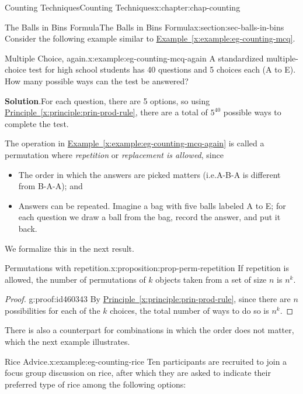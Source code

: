 \documentclass[oneside,10pt,]{book}
\newcommand{\blocktitlefont}{\relax}
\newcommand{\xreffont}{\relax}
\numberwithin{equation}{section}
\begin{document}
\begin{chapterptx}{Counting Techniques}{}{Counting Techniques}{}{}{x:chapter:chap-counting}
\begin{sectionptx}{The Balls in Bins Formula}{}{The Balls in Bins Formula}{}{}{x:section:sec-balls-in-bins}
Consider the following example similar to \hyperref[x:example:eg-counting-mcq]{Example~{\xreffont\ref{x:example:eg-counting-mcq}}}.%
\begin{example}{Multiple Choice, again.}{x:example:eg-counting-mcq-again}%
A standardized multiple-choice test for high school students has 40 questions and 5 choices each (A to E). How many possible ways can the test be answered?%
\par\smallskip%
\noindent\textbf{\blocktitlefont Solution}.\hypertarget{g:solution:id462530}{}\quad{}For each question, there are 5 options, so using \hyperref[x:principle:prin-prod-rule]{Principle~{\xreffont\ref{x:principle:prin-prod-rule}}}, there are a total of \(5^{40}\) possible ways to complete the test.%
\end{example}
The operation in \hyperref[x:example:eg-counting-mcq-again]{Example~{\xreffont\ref{x:example:eg-counting-mcq-again}}} is called a permutation where \emph{repetition} or \emph{replacement is allowed}, since%
\begin{itemize}[label=\textbullet]
\item{}The order in which the answers are picked matters (i.e.\@ A-B-A is different from B-A-A); and%
\item{}Answers can be repeated. Imagine a bag with five balls labeled A to E; for each question we draw a ball from the bag, record the answer, and put it back.%
\end{itemize}
We formalize this in the next result.%
\begin{proposition}{Permutations with repetition.}{}{x:proposition:prop-perm-repetition}%
If repetition is allowed, the number of permutations of \(k\) objects taken from a set of size \(n\) is \(n^k\).%
\end{proposition}
\begin{proof}{}{g:proof:id460343}
By \hyperref[x:principle:prin-prod-rule]{Principle~{\xreffont\ref{x:principle:prin-prod-rule}}}, since there are \(n\) possibilities for each of the \(k\) choices, the total number of ways to do so is \(n^k\).%
\end{proof}
There is also a counterpart for combinations in which the order does not matter, which the next example illustrates.%
\begin{example}{Rice Advice.}{x:example:eg-counting-rice}%
Ten participants are recruited to join a focus group discussion on rice, after which they are asked to indicate their preferred type of rice among the following options:%
\begin{itemize}[label=\textbullet]

\end{itemize}
\end{example}
\end{sectionptx}
\end{chapterptx}
\end{document}
